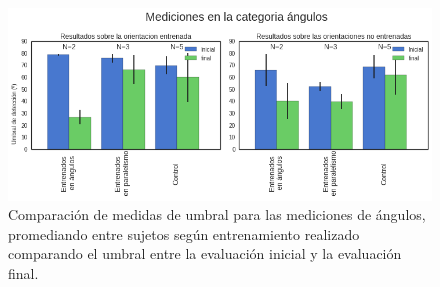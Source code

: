 \documentclass{article}
\begin{document}
    \begin{figure}
        \center
        \includegraphics[width=\textwidth]{Imagenes/TransferenciaAngulosBarras.png}
        \caption{Comparación de medidas de umbral para las mediciones de ángulos, promediando entre sujetos según entrenamiento realizado comparando el umbral entre la evaluación inicial y la evaluación final.}
        \label{fig:TransferenciaAngulosBarras}
    \end{figure}  
    
    
    

\clearpage
\end{document}
